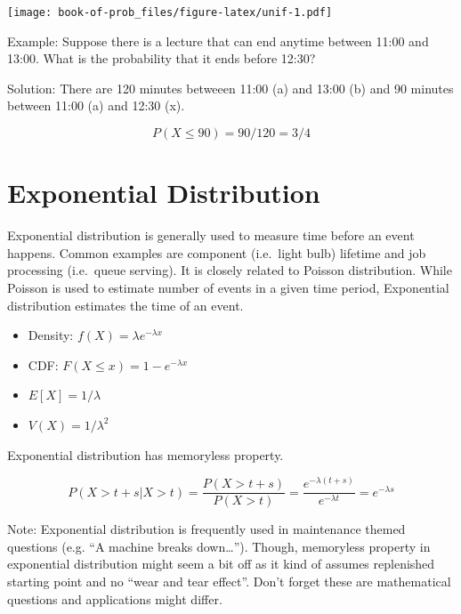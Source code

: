 \documentclass[]{book}
\theoremstyle{definition}
\theoremstyle{definition}
\theoremstyle{definition}
\theoremstyle{remark}
\begin{document}
\texttt{[image: book-of-prob\_files/figure-latex/unif-1.pdf]}

Example: Suppose there is a lecture that can end anytime between 11:00
and 13:00. What is the probability that it ends before 12:30?

Solution: There are 120 minutes betweeen 11:00 (a) and 13:00 (b) and 90
minutes between 11:00 (a) and 12:30 (x).

\[P(X \le 90) = 90/120 = 3/4\]

\hypertarget{exponential-distribution}{%
\section{Exponential Distribution}\label{exponential-distribution}}

Exponential distribution is generally used to measure time before an
event happens. Common examples are component (i.e.~light bulb) lifetime
and job processing (i.e.~queue serving). It is closely related to
Poisson distribution. While Poisson is used to estimate number of events
in a given time period, Exponential distribution estimates the time of
an event.

\begin{itemize}
\item
  Density: \(f(X) = \lambda e^{-\lambda x}\)
\item
  CDF: \(F(X \le x) = 1 - e^{-\lambda x}\)
\item
  \(E[X] = 1/\lambda\)
\item
  \(V(X) = 1/\lambda^2\)
\end{itemize}

Exponential distribution has memoryless property.

\[P(X > t + s | X > t) = \dfrac{P(X > t + s)}{P(X > t)} = \dfrac{e^{-\lambda (t+s)}}{e^{-\lambda t}} = e^{-\lambda s}\]

Note: Exponential distribution is frequently used in maintenance themed
questions (e.g. ``A machine breaks down\ldots{}''). Though, memoryless
property in exponential distribution might seem a bit off as it kind of
assumes replenished starting point and no ``wear and tear effect''.
Don't forget these are mathematical questions and applications might
differ.
\end{document}
